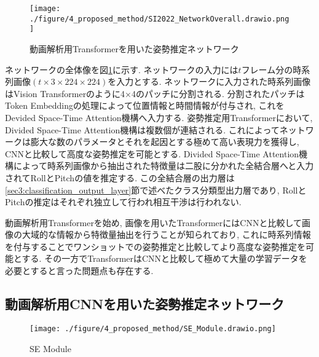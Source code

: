\begin{figure}[thpb]
  \begin{minipage}[htpb]{1.0\hsize}
  \begin{center}
  \texttt{[image: ./figure/4\_proposed\_method/SI2022\_NetworkOverall.drawio.png]}
  \caption{動画解析用Transformerを用いた姿勢推定ネットワーク}
  \label{fig:TimeSformer_Network_Overall}
  \end{center}
  \end{minipage}
\end{figure}
ネットワークの全体像を図\ref{fig:TimeSformer_Network_Overall}に示す. ネットワークの入力には$t$フレーム分の時系列画像$(t\times3\times224\times224)$を入力とする. ネットワークに入力された時系列画像はVision Transformerのように4×4のパッチに分割される. 分割されたパッチはToken Embeddingの処理によって位置情報と時間情報が付与され, これをDevided Space-Time Attention機構へ入力する. 姿勢推定用Transformerにおいて, Divided Space-Time Attention機構は複数個が連結される. これによってネットワークは膨大な数のパラメータとそれを起因とする極めて高い表現力を獲得し, CNNと比較して高度な姿勢推定を可能とする. Divided Space-Time Attention機構によって時系列画像から抽出された特徴量は二股に分かれた全結合層へと入力されてRollとPitchの値を推定する. この全結合層の出力層は\ref{sec3:classification_output_layer}節で述べたクラス分類型出力層\cite{Kawai_SII2022}であり, RollとPitchの推定はそれぞれ独立して行われ相互干渉は行われない. \par
動画解析用Transformerを始め, 画像を用いたTransformerにはCNNと比較して画像の大域的な情報から特徴量抽出を行うことが知られており\cite{Transformer_and_CNN_comparison}, これに時系列情報を付与することでワンショットでの姿勢推定と比較してより高度な姿勢推定を可能とする. その一方でTransformerはCNNと比較して極めて大量の学習データを必要とする\cite{Vision_Transformer_入門}と言った問題点も存在する.

\subsection{動画解析用CNNを用いた姿勢推定ネットワーク}\label{sec:SENet}

\begin{figure}[thpb]
  \begin{minipage}[htpb]{1.0\hsize}
  \begin{center}
  \texttt{[image: ./figure/4\_proposed\_method/SE\_Module.drawio.png]}
  \caption{SE Module}
  \label{fig:SE_Module}
  \end{center}
  \end{minipage}
\end{figure}


